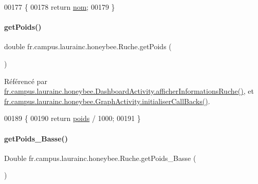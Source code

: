 \begin{DoxyCode}
00177                            \{
00178         \textcolor{keywordflow}{return} \hyperlink{classfr_1_1campus_1_1laurainc_1_1honeybee_1_1_ruche_ae18dd003de10a89841422fd96b1139d7}{nom};
00179     \}
\end{DoxyCode}
\mbox{\label{classfr_1_1campus_1_1laurainc_1_1honeybee_1_1_ruche_a1dce2bd8e8de34d082abd36eab6693d3}} 
\paragraph{\texorpdfstring{get\+Poids()}{getPoids()}}
{\footnotesize\ttfamily double fr.\+campus.\+laurainc.\+honeybee.\+Ruche.\+get\+Poids (\begin{DoxyParamCaption}{ }\end{DoxyParamCaption})}



Référencé par \hyperlink{classfr_1_1campus_1_1laurainc_1_1honeybee_1_1_dashboard_activity_a88f00531bee33bd6c47b33f5ac4df9ed}{fr.\+campus.\+laurainc.\+honeybee.\+Dashboard\+Activity.\+afficher\+Informations\+Ruche()}, et \hyperlink{classfr_1_1campus_1_1laurainc_1_1honeybee_1_1_graph_activity_a8dc56c3e0744bcb9295ad10e726b5fdb}{fr.\+campus.\+laurainc.\+honeybee.\+Graph\+Activity.\+initialiser\+Call\+Backs()}.


\begin{DoxyCode}
00189                              \{
00190         \textcolor{keywordflow}{return} \hyperlink{classfr_1_1campus_1_1laurainc_1_1honeybee_1_1_ruche_a9e4ace1f74bc297cb50e99643203367b}{poids} / 1000;
00191     \}
\end{DoxyCode}
\mbox{\label{classfr_1_1campus_1_1laurainc_1_1honeybee_1_1_ruche_a050f2a5a3ef1804df286dc94814ff66a}} 
\paragraph{\texorpdfstring{get\+Poids\+\_\+\+Basse()}{getPoids\_Basse()}}
{\footnotesize\ttfamily Double fr.\+campus.\+laurainc.\+honeybee.\+Ruche.\+get\+Poids\+\_\+\+Basse (\begin{DoxyParamCaption}{ }\end{DoxyParamCaption})}



